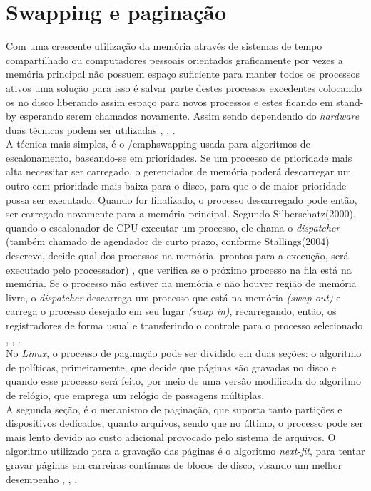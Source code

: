 \section{Swapping e paginação}

Com uma crescente utilização da memória através de sistemas de tempo compartilhado ou computadores pessoais orientados graficamente por vezes a memória principal não possuem espaço suficiente para manter todos os processos ativos uma solução para isso é salvar parte destes processos excedentes colocando os no disco liberando assim espaço para novos processos e estes ficando em stand-by esperando serem chamados novamente. Assim sendo dependendo do \emph{hardware} duas técnicas podem ser utilizadas \cite{ufscar2019}, \cite{silberschatz2000}, \cite{stallings2004}.\\
A técnica mais simples, é o /emph{swapping} usada para algoritmos de escalonamento, baseando-se em prioridades. Se um processo de prioridade mais alta necessitar ser carregado, o gerenciador de memória poderá descarregar um outro com prioridade mais baixa para o disco, para que o de maior prioridade possa ser executado. Quando for finalizado, o processo descarregado pode então, ser carregado novamente para a memória principal. Segundo Silberschatz(2000), quando o escalonador de CPU executar um processo, ele chama o \emph{dispatcher} (também chamado de agendador de curto prazo, conforme Stallings(2004) descreve, decide qual dos processos na memória, prontos para a execução, será executado pelo processador) , que verifica se o próximo processo na fila está na memória. Se o processo não estiver na memória e não houver região de memória livre, o \emph{dispatcher} descarrega um processo que está na memória \emph{(swap out)} e carrega o processo desejado em seu lugar \emph{(swap in)}, recarregando, então, os registradores de forma usual e transferindo o controle para o processo selecionado \cite{ufscar2019}, \cite{silberschatz2000}, \cite{stallings2004}.\\
No \emph{Linux}, o processo de paginação pode ser dividido em duas seções: o algoritmo de políticas, primeiramente, que decide que páginas são gravadas no disco e quando esse processo será feito, por meio de uma versão modificada do algoritmo de relógio, que emprega um relógio de passagens múltiplas. \\
A segunda seção, é o mecanismo de paginação, que suporta tanto partições e dispositivos dedicados, quanto arquivos, sendo que no último, o processo pode ser mais lento devido ao custo adicional provocado pelo sistema de arquivos. O algoritmo utilizado para a gravação das páginas é o algoritmo \emph{next-fit}, para tentar gravar páginas em carreiras contínuas de blocos de disco, visando um melhor desempenho \cite{ufscar2019}, \cite{silberschatz2000}, \cite{stallings2004}.